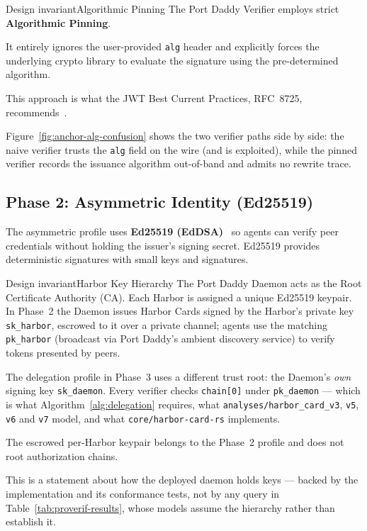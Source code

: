 \documentclass[11pt,a4paper]{article}
\theoremstyle{definition}
\begin{document}
\ifdefined\pdswisslandmarkplate
\begin{figure}[p]
  \centering
\end{figure}
\fi

\begin{pdclaim}{Design invariant}{Algorithmic Pinning}
\setlength{\parskip}{4pt plus 1pt}
\label{prop:alg-pinning}
The Port Daddy Verifier employs strict \textbf{Algorithmic Pinning}.

It entirely ignores the user-provided \texttt{alg} header and explicitly forces the underlying crypto library to evaluate the signature using the pre-determined algorithm.

This approach is what the JWT Best Current Practices, RFC~8725, recommends~.
\end{pdclaim}

Figure~\ref{fig:anchor-alg-confusion} shows the two verifier paths side by side: the naive verifier trusts the \texttt{alg} field on the wire (and is exploited), while the pinned verifier records the issuance algorithm out-of-band and admits no rewrite trace.



\subsection{Phase 2: Asymmetric Identity (Ed25519)}

The asymmetric profile uses \textbf{Ed25519 (EdDSA)}~ so agents can verify peer credentials without holding the issuer's signing secret. Ed25519 provides deterministic signatures with small keys and signatures.

\begin{pdclaim}{Design invariant}{Harbor Key Hierarchy}
\setlength{\parskip}{4pt plus 1pt}
\label{def:anchor-key-hierarchy}
The Port Daddy Daemon acts as the Root Certificate Authority (CA). Each Harbor is assigned a unique Ed25519 keypair. In Phase~2 the Daemon issues Harbor Cards signed by the Harbor's private key \texttt{sk\_harbor}, escrowed to it over a private channel; agents use the matching \texttt{pk\_harbor} (broadcast via Port Daddy's ambient discovery service) to verify tokens presented by peers.

The delegation profile in Phase~3 uses a different trust root: the Daemon's \emph{own} signing key \texttt{sk\_daemon}. Every verifier checks \texttt{chain[0]} under \texttt{pk\_daemon} --- which is what Algorithm~\ref{alg:delegation} requires, what \texttt{analyses/harbor\_card\_v3}, \texttt{v5}, \texttt{v6} and \texttt{v7} model, and what \texttt{core/harbor-card-rs} implements.

The escrowed per-Harbor keypair belongs to the Phase~2 profile and does not root authorization chains.

This is a statement about how the deployed daemon holds keys --- backed by the implementation and its conformance tests, not by any query in Table~\ref{tab:proverif-results}, whose models assume the hierarchy rather than establish it.
\end{pdclaim}
\end{document}

